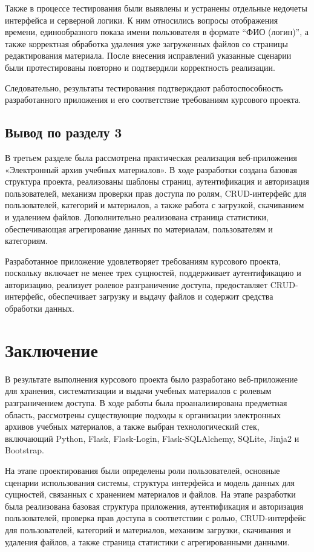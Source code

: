 \documentclass[14pt,a4paper]{extarticle}
\begin{document}
Также в процессе тестирования были выявлены и устранены отдельные недочеты интерфейса и серверной логики. К ним относились вопросы отображения времени, единообразного показа имени пользователя в формате ``ФИО (логин)'', а также корректная обработка удаления уже загруженных файлов со страницы редактирования материала. После внесения исправлений указанные сценарии были протестированы повторно и подтвердили корректность реализации.

Следовательно, результаты тестирования подтверждают работоспособность разработанного приложения и его соответствие требованиям курсового проекта.

\subsection*{Вывод по разделу 3}

В третьем разделе была рассмотрена практическая реализация веб-приложения «Электронный архив учебных материалов». В ходе разработки создана базовая структура проекта, реализованы шаблоны страниц, аутентификация и авторизация пользователей, механизм проверки прав доступа по ролям, CRUD-интерфейс для пользователей, категорий и материалов, а также работа с загрузкой, скачиванием и удалением файлов. Дополнительно реализована страница статистики, обеспечивающая агрегирование данных по материалам, пользователям и категориям.

Разработанное приложение удовлетворяет требованиям курсового проекта, поскольку включает не менее трех сущностей, поддерживает аутентификацию и авторизацию, реализует ролевое разграничение доступа, предоставляет CRUD-интерфейс, обеспечивает загрузку и выдачу файлов и содержит средства обработки данных.

\section*{Заключение}

В результате выполнения курсового проекта было разработано веб-приложение для хранения, систематизации и выдачи учебных материалов с ролевым разграничением доступа. В ходе работы была проанализирована предметная область, рассмотрены существующие подходы к организации электронных архивов учебных материалов, а также выбран технологический стек, включающий Python, Flask, Flask-Login, Flask-SQLAlchemy, SQLite, Jinja2 и Bootstrap.

На этапе проектирования были определены роли пользователей, основные сценарии использования системы, структура интерфейса и модель данных для сущностей, связанных с хранением материалов и файлов. На этапе разработки была реализована базовая структура приложения, аутентификация и авторизация пользователей, проверка прав доступа в соответствии с ролью, CRUD-интерфейс для пользователей, категорий и материалов, механизм загрузки, скачивания и удаления файлов, а также страница статистики с агрегированными данными.
\end{document}
